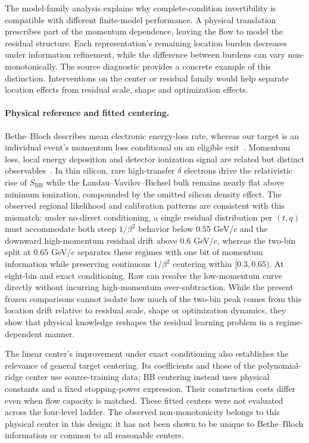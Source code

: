 \documentclass[twocolumn,epjc3]{svjour3}
\begin{document}
The model-family analysis explains why complete-condition invertibility is
compatible with different finite-model performance. A physical translation
prescribes part of the momentum dependence, leaving the flow to model the
residual structure. Each representation's remaining location burden decreases
under information refinement, while the difference between burdens can vary
non-monotonically. The source diagnostic provides a concrete example of this
distinction. Interventions on the center or residual family would help
separate location effects from residual scale, shape and optimization effects.

\paragraph{Physical reference and fitted centering.}
Bethe--Bloch describes mean electronic energy-loss rate, whereas our target
is an individual event's momentum loss conditional on an eligible
exit~\cite{Bichsel1988,PDG2025}. Momentum loss, local energy deposition and
detector ionization signal are related but distinct
observables~\cite{Bichsel2006}. In thin silicon, rare high-transfer $\delta$
electrons drive the relativistic rise of $S_{\mathrm{BB}}$ while the
Landau--Vavilov--Bichsel bulk remains nearly flat above minimum ionization,
compounded by the omitted silicon density effect. The observed regional
likelihood and calibration patterns are consistent with this mismatch: under
no-direct conditioning, a single residual distribution per $(t,q)$ must
accommodate both steep $1/\beta^2$ behavior below $0.55$ GeV/$c$ and the
downward high-momentum residual drift above $0.6$ GeV/$c$, whereas the two-bin
split at $0.65$ GeV/$c$ separates these regimes with one bit of momentum
information while preserving continuous $1/\beta^2$ centering within
$[0.3,0.65)$. At eight-bin and exact conditioning, Raw can resolve the
low-momentum curve directly without incurring high-momentum over-subtraction.
While the present frozen comparisons cannot isolate how much of the two-bin
peak comes from this location drift relative to residual scale, shape or
optimization dynamics, they show that physical knowledge reshapes the residual
learning problem in a regime-dependent manner.

The linear center's improvement under exact conditioning also establishes
the relevance of general target centering. Its coefficients and those of the
polynomial-ridge center use source-training data; BB centering instead uses
physical constants and a fixed stopping-power expression. Their construction
costs differ even when flow capacity is matched. These fitted centers were
not evaluated across the four-level ladder. The observed non-monotonicity
belongs to this physical center in this design; it has not been shown to be
unique to Bethe--Bloch information or common to all reasonable centers.
\end{document}
